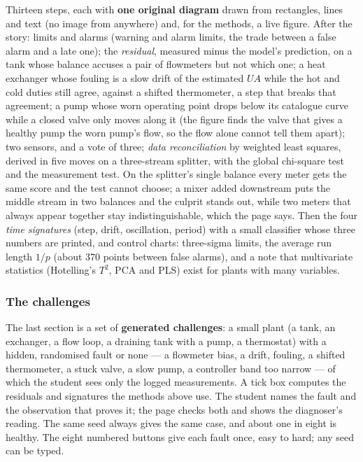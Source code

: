 \documentclass[11pt,a4paper]{article}
\begin{document}
Thirteen steps, each with \textbf{one original diagram} drawn from rectangles,
lines and text (no image from anywhere) and, for the methods, a live figure.
After the story: limits and alarms (warning and alarm limits, the trade
between a false alarm and a late one); the \emph{residual}, measured minus the
model's prediction, on a tank whose balance accuses a pair of flowmeters but
not which one; a heat exchanger whose fouling is a slow drift of the estimated
$UA$ while the hot and cold duties still agree, against a shifted thermometer,
a step that breaks that agreement; a pump whose worn operating point drops
below its catalogue curve while a closed valve only moves along it (the figure
finds the valve that gives a healthy pump the worn pump's flow, so the flow
alone cannot tell them apart); two sensors, and a vote of three; \emph{data
reconciliation} by weighted least squares, derived in five moves on a
three-stream splitter, with the global chi-square test and the measurement
test.  On the splitter's single balance every meter gets the same score and the
test cannot choose; a mixer added downstream puts the middle stream in two
balances and the culprit stands out, while two meters that always appear
together stay indistinguishable, which the page says.  Then the four \emph{time
signatures} (step, drift, oscillation, period) with a small classifier whose
three numbers are printed, and control charts: three-sigma limits, the
average run length $1/p$ (about 370 points between false alarms), and a note
that multivariate statistics (Hotelling's $T^2$, PCA and PLS) exist for plants
with many variables.

\subsubsection*{The challenges}

The last section is a set of \textbf{generated challenges}: a small plant (a
tank, an exchanger, a flow loop, a draining tank with a pump, a thermostat)
with a hidden, randomised fault or none --- a flowmeter bias, a drift, fouling,
a shifted thermometer, a stuck valve, a slow pump, a controller band too
narrow --- of which the student sees only the logged measurements.  A tick box
computes the residuals and signatures the methods above use.  The student
names the fault and the observation that proves it; the page checks both and
shows the diagnoser's reading.  The same seed always gives the same case, and
about one in eight is healthy.  The eight numbered buttons give each fault once,
easy to hard; any seed can be typed.
\end{document}
